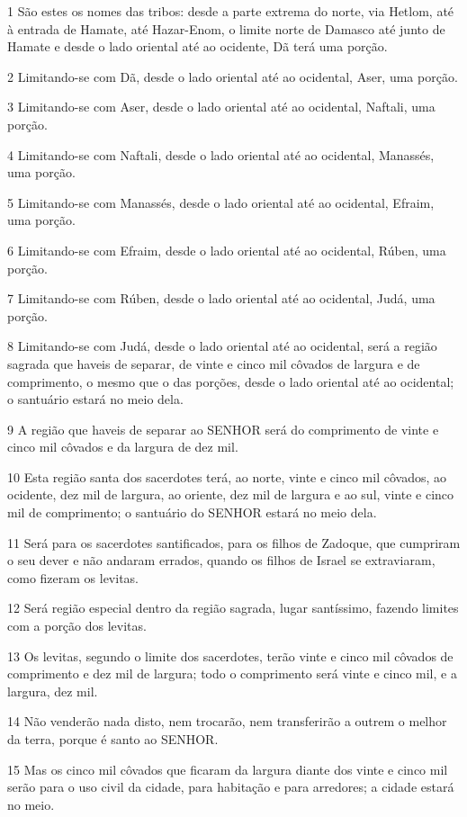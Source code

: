 \par 1 São estes os nomes das tribos: desde a parte extrema do norte, via Hetlom, até à entrada de Hamate, até Hazar-Enom, o limite norte de Damasco até junto de Hamate e desde o lado oriental até ao ocidente, Dã terá uma porção.
\par 2 Limitando-se com Dã, desde o lado oriental até ao ocidental, Aser, uma porção.
\par 3 Limitando-se com Aser, desde o lado oriental até ao ocidental, Naftali, uma porção.
\par 4 Limitando-se com Naftali, desde o lado oriental até ao ocidental, Manassés, uma porção.
\par 5 Limitando-se com Manassés, desde o lado oriental até ao ocidental, Efraim, uma porção.
\par 6 Limitando-se com Efraim, desde o lado oriental até ao ocidental, Rúben, uma porção.
\par 7 Limitando-se com Rúben, desde o lado oriental até ao ocidental, Judá, uma porção.
\par 8 Limitando-se com Judá, desde o lado oriental até ao ocidental, será a região sagrada que haveis de separar, de vinte e cinco mil côvados de largura e de comprimento, o mesmo que o das porções, desde o lado oriental até ao ocidental; o santuário estará no meio dela.
\par 9 A região que haveis de separar ao SENHOR será do comprimento de vinte e cinco mil côvados e da largura de dez mil.
\par 10 Esta região santa dos sacerdotes terá, ao norte, vinte e cinco mil côvados, ao ocidente, dez mil de largura, ao oriente, dez mil de largura e ao sul, vinte e cinco mil de comprimento; o santuário do SENHOR estará no meio dela.
\par 11 Será para os sacerdotes santificados, para os filhos de Zadoque, que cumpriram o seu dever e não andaram errados, quando os filhos de Israel se extraviaram, como fizeram os levitas.
\par 12 Será região especial dentro da região sagrada, lugar santíssimo, fazendo limites com a porção dos levitas.
\par 13 Os levitas, segundo o limite dos sacerdotes, terão vinte e cinco mil côvados de comprimento e dez mil de largura; todo o comprimento será vinte e cinco mil, e a largura, dez mil.
\par 14 Não venderão nada disto, nem trocarão, nem transferirão a outrem o melhor da terra, porque é santo ao SENHOR.
\par 15 Mas os cinco mil côvados que ficaram da largura diante dos vinte e cinco mil serão para o uso civil da cidade, para habitação e para arredores; a cidade estará no meio.
